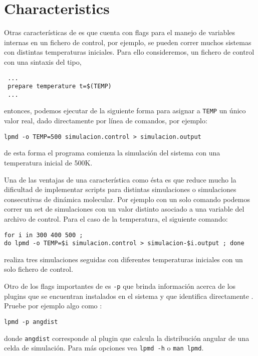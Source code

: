 \section{Characteristics}

Otras caracter\'isticas de {\lpmd} es que cuenta con flags para el manejo de variables internas en un fichero de control, por ejemplo, se pueden correr muchos sistemas con distintas temperaturas iniciales. Para ello consideremos, un fichero de control con una sintaxis del tipo,

\begin{verbatim}
 ...
 prepare temperature t=$(TEMP)
 ...
\end{verbatim}
\noindent
entonces, podemos ejecutar {\lpmd} de la siguiente forma para asignar a \verb|TEMP| un \'unico valor real, dado directamente por l\'inea de comandos, por ejemplo:

\begin{center}
 \texttt{lpmd -o TEMP=500 simulacion.control > simulacion.output}
\end{center}
\noindent
de esta forma el programa comienza la simulaci\'on del sistema con una temperatura inicial de 500K. 

Una de las ventajas de una caracter\'istica como \'esta es que reduce mucho la dificultad de implementar scripts para distintas simulaciones o simulaciones consecutivas de din\'amica molecular. Por ejemplo con un solo comando podemos correr un set de simulaciones con un valor distinto asociado a una variable del archivo de control. Para el caso de la temperatura, el siguiente comando:

\begin{center}
 \texttt{for i in 300 400 500 ; \\do lpmd -o TEMP=\$i simulacion.control > simulacion-\$i.output ; done}
\end{center}
\noindent
realiza tres simulaciones seguidas con diferentes temperaturas iniciales con un solo fichero de control.


Otro de los flags importantes de {\lpmd} es \verb|-p| que brinda informaci\'on acerca de los plugins que se encuentran instalados en el sistema y que identifica directamente {\lpmd}. Pruebe por ejemplo algo como :

\begin{center}
 \texttt{lpmd -p angdist}
\end{center}
\noindent
donde \verb|angdist| corresponde al plugin que calcula la distribuci\'on angular de una celda de simulaci\'on. Para m\'as opciones vea \verb|lpmd -h| o \verb|man lpmd|. 

